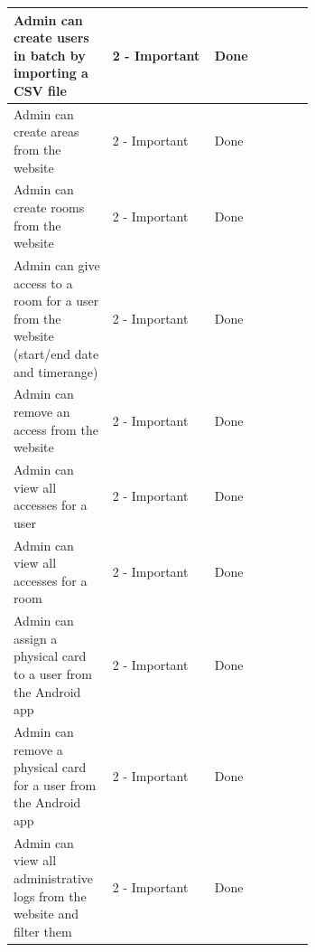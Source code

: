 \documentclass[twoside, openright,11pt,a4paper]{book}
\begin{document}
\begin{longtable}[c]{|p{0.33\linewidth}|l|p{0.33\linewidth}|}
Admin can create users in batch by importing a CSV file                                                                                        & 2 - Important     & Done                                             \\ \hline
Admin can create areas from the website                                                                                                        & 2 - Important     & Done                                             \\ \hline
Admin can create rooms from the website                                                                                                        & 2 - Important     & Done                                             \\ \hline
Admin can give access to a room for a user from the website (start/end date and timerange)                                                     & 2 - Important     & Done                                             \\ \hline
Admin can remove an access from the website                                                                                                    & 2 - Important     & Done                                             \\ \hline
Admin can view all accesses for a user                                                                                                         & 2 - Important     & Done                                             \\ \hline
Admin can view all accesses for a room                                                                                                         & 2 - Important     & Done                                             \\ \hline
Admin can assign a physical card to a user from the Android app                                                                                & 2 - Important     & Done                                             \\ \hline
Admin can remove a physical card for a user from the Android app                                                                               & 2 - Important     & Done                                             \\ \hline
Admin can view all administrative logs from the website and filter them                                                                        & 2 - Important     & Done                                             \\ \hline

\end{longtable}
\end{document}
